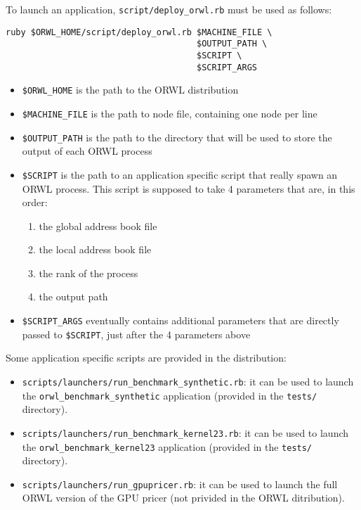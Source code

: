\documentclass[10pt]{article}
\begin{document}
To launch an application, \texttt{script/deploy\_orwl.rb} must be used
as follows:
\begin{verbatim}
ruby $ORWL_HOME/script/deploy_orwl.rb $MACHINE_FILE \
                                      $OUTPUT_PATH \
                                      $SCRIPT \
                                      $SCRIPT_ARGS
\end{verbatim}
\begin{itemize}
\item \texttt{\$ORWL\_HOME} is the path to the ORWL distribution
\item \texttt{\$MACHINE\_FILE} is the path to node file, containing
  one node per line
\item \texttt{\$OUTPUT\_PATH} is the path to the directory that will
  be used to store the output of each ORWL process
\item \texttt{\$SCRIPT} is the path to an application specific script
  that really spawn an  ORWL process. This script is supposed to take
  4 parameters that are, in this order: 
  \begin{enumerate}
  \item the global address book file
  \item the local address book file
  \item the rank of the process
  \item the output path
  \end{enumerate}
\item \texttt{\$SCRIPT\_ARGS} eventually contains additional
  parameters that are directly passed to \texttt{\$SCRIPT}, just after
  the 4 parameters above
\end{itemize}

Some application specific scripts are provided in the distribution:
\begin{itemize}
\item \texttt{scripts/launchers/run\_benchmark\_synthetic.rb}: it can
  be used to launch the \texttt{orwl\_benchmark\_synthetic}
  application (provided in the \texttt{tests/} directory).
\item \texttt{scripts/launchers/run\_benchmark\_kernel23.rb}: it can be
  used to launch the \texttt{orwl\_benchmark\_kernel23} application
  (provided in the \texttt{tests/} directory).
\item \texttt{scripts/launchers/run\_gpupricer.rb}: it can be used to
  launch the full ORWL version of the GPU pricer (not privided in the
  ORWL ditribution).
\end{itemize}
\end{document}
